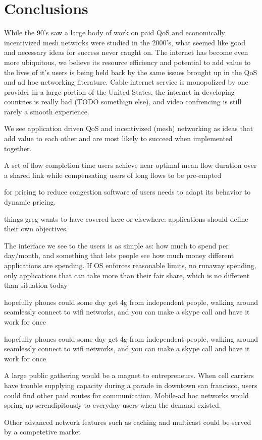 \section{Conclusions}
While the 90's saw a large body of work on paid QoS and economically incentivized mesh networks were studied in the 2000's, what seemed like good and necessary ideas for success never caught on. The internet has become even more ubiquitous, we believe its resource efficiency and potential to add value to the lives of it's users is being held back by the same issues brought up in the QoS and ad hoc networking literature. Cable internet service is monopolized by one provider in a large portion of the United States, the internet in developing countries is really bad (TODO somethign else), and video confrencing is still rarely a smooth experience.

We see application driven QoS and incentivized (mesh) networking as ideas that add value to each other and are most likely to succeed when implemented together.

A set of flow completion time users achieve near optimal mean flow duration over a shared link while compensating users of long flows to be pre-empted

for pricing to reduce congestion software of users needs to adapt its behavior to dynamic pricing.

things greg wants to have covered here or elsewhere:
applications should define their own objectives.

The interface we see to the users is as simple as: how much to spend per day/month, and something that lets people see how much money different applications are spending. If OS enforces reasonable limits, no runaway spending, only applications that can take more than their fair share, which is no different than situation today

hopefully phones could some day get 4g from independent people, walking around seamlessly connect to wifi networks, and you can make a skype call and have it work for once

hopefully phones could some day get 4g from independent people, walking around seamlessly connect to wifi networks, and you can make a skype call and have it work for once

A large public gathering would be a magnet to entrepreneurs. When cell carriers have trouble supplying capacity during a parade in downtown san francisco, users could find other paid routes for communication. Mobile-ad hoc networks would spring up serendipitously to everyday users when the demand existed.

Other advanced network features such as caching and multicast could be served by a competetive market
\label{sec:conc}
